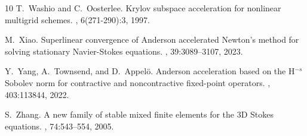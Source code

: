 \documentclass{article}
\numberwithin{equation}{section}
\begin{document}
\begin{thebibliography}{10}
T.~Washio and C.~Oosterlee.
\newblock Krylov subspace acceleration for nonlinear multigrid schemes.
, 6(271-290):3, 1997.

M.~Xiao.
\newblock Superlinear convergence of {A}nderson accelerated {N}ewton's method
  for solving stationary {N}avier-{S}tokes equations.
,
  39:3089--3107, 2023.

Y.~Yang, A.~Townsend, and D.~Appel\"o.
\newblock Anderson acceleration based on the {H$^{-s}$ S}obolev norm for
  contractive and noncontractive fixed-point operators.
, 403:113844,
  2022.

S.~Zhang.
\newblock A new family of stable mixed finite elements for the {3D} {S}tokes
  equations.
, 74:543--554, 2005.

\end{thebibliography}
\end{document}
